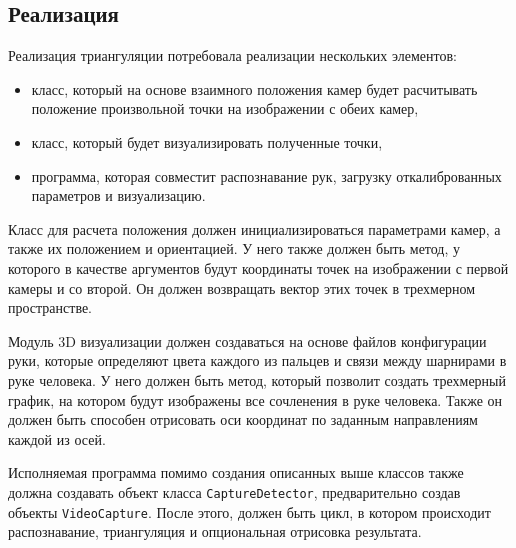 \documentclass[12pt, a4paper]{article}
\begin{document}
\subsection{Реализация}
Реализация триангуляции потребовала реализации нескольких элементов:
\begin{itemize}
  \item класс, который на основе взаимного положения камер будет расчитывать
    положение произвольной точки на изображении с обеих камер,
  \item класс, который будет визуализировать полученные точки,
  \item программа, которая совместит распознавание рук, загрузку
    откалиброванных параметров и визуализацию.
\end{itemize}

Класс для расчета положения должен инициализироваться параметрами камер, а
также их положением и ориентацией. У него также должен быть метод, у которого в
качестве аргументов будут координаты точек на изображении с первой камеры и со
второй. Он должен возвращать вектор этих точек в трехмерном пространстве. 

Модуль 3D визуализации должен создаваться на основе файлов конфигурации руки,
которые определяют цвета каждого из пальцев и связи между шарнирами в руке
человека. У него должен быть метод, который позволит создать трехмерный график,
на котором будут изображены все сочленения в руке человека. Также он должен
быть способен отрисовать оси координат по заданным направлениям каждой из осей.

Исполняемая программа помимо создания описанных выше классов также должна
создавать объект класса \texttt{CaptureDetector}, предварительно создав объекты
\texttt{VideoCapture}. После этого, должен быть цикл, в котором происходит
распознавание, триангуляция и опциональная отрисовка результата.
\end{document}
